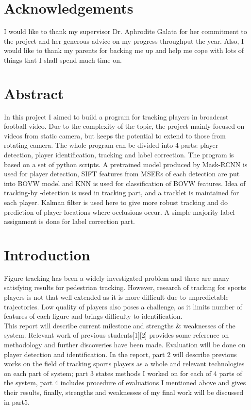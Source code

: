 \documentclass{article}
\begin{document}
\section*{Acknowledgements}
I would like to thank my supervisor Dr. Aphrodite Galata for her commitment to the project and her generous advice on my progress throughput the year. Also, I would like to thank my parents for backing me up and help me cope with lots of things that I shall spend much time on.
\newpage

\section*{Abstract}
In this project I aimed to build a program for tracking players in broadcast football video. Due to the complexity of the topic, the project mainly focused on videos from static camera, but keeps the potential to extend to those from rotating camera. The whole program can be divided into 4 parts: player detection, player identification, tracking and label correction. 
The program is based on a set of python scripts. A pretrained model produced by Mask-RCNN is used for player detection, SIFT features from MSERs of each detection are put into BOVW model and KNN is used for classification of BOVW features. Idea of tracking-by -detection is used in tracking part, and a tracklet is maintained for each player. Kalman filter is used here to give more robust tracking and do prediction of player locations where occlusions occur. A simple majority label assignment is done for label correction part.
\newpage

\tableofcontents
\newpage
\listoffigures
\newpage
\listoftables
\newpage

\section{Introduction}
Figure tracking has been a widely investigated problem and there are many satisfying results for pedestrian tracking. However, research of tracking for sports players is not that well extended as it is more difficult due to unpredictable trajectories. Low quality of players also poses a challenge, as it limits number of features of each figure and brings difficulty to identification.\\
This report will describe current milestone and strengths \& weaknesses of the system. Relevant work of previous students[1][2] provides some reference on methodology and further discoveries have been made. Evaluation will be done on player detection and identification. In the report, part 2 will describe previous works on the field of tracking sports players as a whole and relevant technologies on each part of system; part 3 states methods I worked on for each of 4 parts of the system, part 4 includes procedure of evaluations I mentioned above and gives their results, finally, strengths and weaknesses of my final work will be discussed in part5. 
\end{document}

